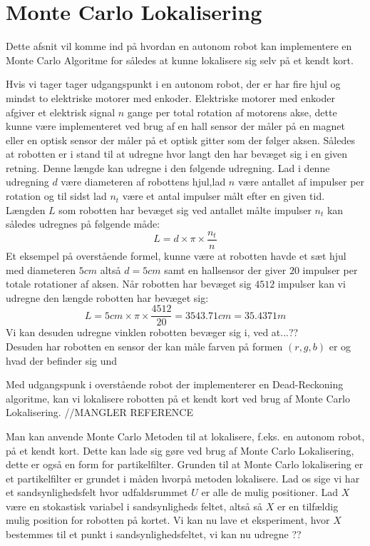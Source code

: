 \documentclass[../../SRP.tex]{subfiles}
\begin{document}
\chapter{Monte Carlo Lokalisering}
Dette afsnit vil komme ind på hvordan en autonom robot kan implementere en Monte Carlo Algoritme for således at kunne lokalisere sig selv på et kendt kort.  

Hvis vi tager tager udgangspunkt i en autonom robot, der er har fire hjul og mindst to elektriske motorer med enkoder. Elektriske motorer med enkoder afgiver et elektrisk signal $n$ gange per total rotation af motorens akse, dette kunne være implementeret ved brug af en hall sensor der måler på en magnet eller en optisk sensor der måler på et optisk gitter som der følger aksen. Således at robotten er i stand til at udregne hvor langt den har bevæget sig i en given retning. Denne længde kan udregne i den følgende udregning. Lad i denne udregning $d$ være diameteren af robottens hjul,lad $n$ være antallet af impulser per rotation og til sidst lad $n_t$ være et antal impulser målt efter en given tid. Længden $L$ som robotten har bevæget sig ved antallet målte impulser $n_t$ kan således udregnes på følgende måde:
\begin{equation}
  L = d \times \pi \times \frac{n_t}{n}
\end{equation}
Et eksempel på overstående formel, kunne være at robotten havde et sæt hjul med diameteren $5cm$ altså $d = 5cm$ samt en hallsensor der giver $20$ impulser per totale rotationer af aksen. Når robotten har bevæget sig $4512$ impulser kan vi udregne den længde robotten har bevæget sig:
\begin{equation}
  L = 5cm \times \pi \times \frac{4512}{20} = 3543.71cm = 35.4371m
\end{equation}
Vi kan desuden udregne vinklen robotten bevæger sig i, ved at...?? \\

Desuden har robotten en sensor der kan måle farven på formen $(r,g,b)$ er og hvad der befinder sig und

Med udgangspunk i overstående robot der implementerer en Dead-Reckoning algoritme, kan vi lokalisere robotten på et kendt kort ved brug af Monte Carlo Lokalisering. //MANGLER REFERENCE

Man kan anvende Monte Carlo Metoden til at lokalisere, f.eks. en autonom robot, på et kendt kort. Dette kan lade sig gøre ved brug af Monte Carlo Lokalisering, dette er også en form for partikelfilter. Grunden til at Monte Carlo lokalisering er et partikelfilter er grundet i måden hvorpå metoden lokalisere. Lad os sige vi har et sandsynlighedsfelt hvor udfaldsrummet $U$ er alle de mulig positioner. Lad $X$ være en stokastisk variabel i sandsynligheds feltet, altså så $X$ er en tilfældig mulig position for robotten på kortet. Vi kan nu lave et eksperiment, hvor $X$ bestemmes til et punkt i sandsynlighedsfeltet, vi kan nu udregne ??
\end{document}
